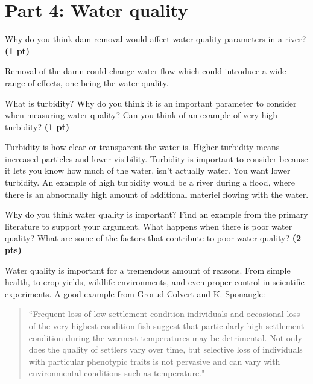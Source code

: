 \documentclass[12pt,letterpaper]{article}
\begin{document}
\section*{Part 4: Water quality}
\begin{enumerate}[font=\bfseries, wide, resume]
    {\color{gray}\item Why do you think dam removal would affect water quality parameters in a river? \textbf{(1 pt)}\par}

    Removal of the damn could change water flow which could introduce a wide range of effects, one being the water quality. 

    {\color{gray}\item What is turbidity? Why do you think it is an important parameter to consider when measuring water quality? Can you think of an example of very high turbidity? \textbf{(1 pt)}\par}

    Turbidity is how clear or transparent the water is. Higher turbidity means increased particles and lower visibility. Turbidity is important to consider because it lets you know how much of the water, isn't actually water. You want lower turbidity. An example of high turbidity would be a river during a flood, where there is an abnormally high amount of additional materiel flowing with the water. 

    {\color{gray}\item Why do you think water quality is important? Find an example from the primary literature to support your argument. What happens when there is poor water quality? What are some of the factors that contribute to poor water quality? \textbf{(2 pts)}\par}

    Water quality is important for a tremendous amount of reasons. From simple health, to crop yields, wildlife environments, and even proper control in scientific experiments. A good example from Grorud-Colvert and K. Sponaugle:

    \begin{quotation}
        ``Frequent loss of low settlement condition individuals and occasional loss of the very highest condition fish suggest that particularly high settlement condition during the warmest temperatures may be detrimental. Not only does the quality of settlers vary over time, but selective loss of individuals with particular phenotypic traits is not pervasive and can vary with environmental conditions such as temperature."
    \end{quotation}


\end{enumerate}
\end{document}
